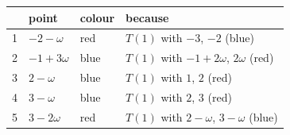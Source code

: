 \begin{center}\small\begin{longtable}{rlll}\toprule & point & colour & because\\\midrule\endhead
1 & $-2-\omega$ & red & $T(1)$ with $-3$, $-2$ (blue)\\
2 & $-1+3\omega$ & blue & $T(1)$ with $-1+2\omega$, $2\omega$ (red)\\
3 & $2-\omega$ & blue & $T(1)$ with $1$, $2$ (red)\\
4 & $3-\omega$ & blue & $T(1)$ with $2$, $3$ (red)\\
5 & $3-2\omega$ & red & $T(1)$ with $2-\omega$, $3-\omega$ (blue)\\
\bottomrule\end{longtable}\end{center}
